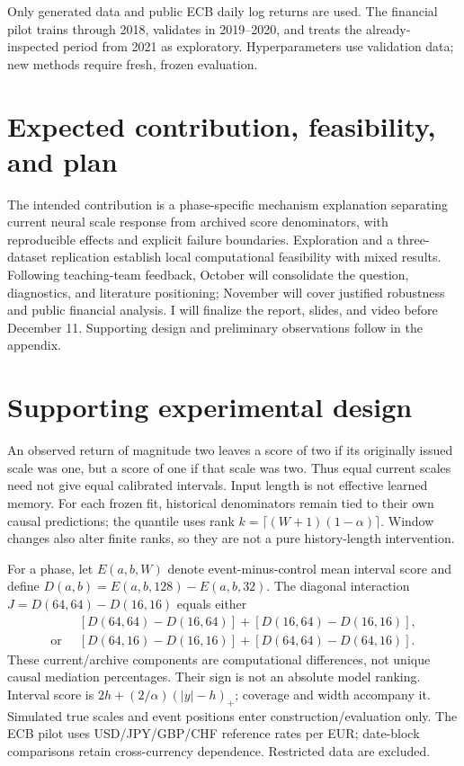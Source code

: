\documentclass{article}
\begin{document}
Only generated data and public ECB daily log returns are used. The financial
pilot trains through 2018, validates in 2019--2020, and treats the
already-inspected period from 2021 as exploratory. Hyperparameters use
validation data; new methods require fresh, frozen evaluation.

\section{Expected contribution, feasibility, and plan}
The intended contribution is a phase-specific mechanism explanation separating
current neural scale response from archived score denominators, with
reproducible effects and explicit failure boundaries. Exploration and a
three-dataset replication establish local computational feasibility with mixed
results. Following teaching-team feedback, October will consolidate the
question, diagnostics, and literature positioning; November will cover
justified robustness and public financial analysis. I will finalize the report,
slides, and video before December 11. Supporting design and preliminary
observations follow in the appendix.

\clearpage
\appendix
\renewcommand{\thesection}{Appendix~\Alph{section}}
\section{Supporting experimental design}
An observed return of magnitude two leaves a score of two if its originally
issued scale was one, but a score of one if that scale was two. Thus equal
current scales need not give equal calibrated intervals. Input length is not
effective learned memory. For each frozen fit, historical denominators remain
tied to their own causal predictions; the quantile uses rank
$k=\lceil(W+1)(1-\alpha)\rceil$. Window changes also alter finite ranks, so they
are not a pure history-length intervention.

For a phase, let $E(a,b,W)$ denote event-minus-control mean interval score and
define $D(a,b)=E(a,b,128)-E(a,b,32)$. The diagonal interaction
$J=D(64,64)-D(16,16)$ equals either
\[
\begin{aligned}
 &[D(64,64)-D(16,64)]+[D(16,64)-D(16,16)],\\
 \text{or }\
 &[D(64,16)-D(16,16)]+[D(64,64)-D(64,16)].
\end{aligned}
\]
These current/archive components are computational differences, not unique
causal mediation percentages. Their sign is not an absolute model ranking.
Interval score is $2h+(2/\alpha)(|y|-h)_+$; coverage and width accompany it.
Simulated true scales and event positions enter construction/evaluation only.
The ECB pilot uses USD/JPY/GBP/CHF reference rates per EUR; date-block
comparisons retain cross-currency dependence. Restricted data are excluded.
\end{document}

